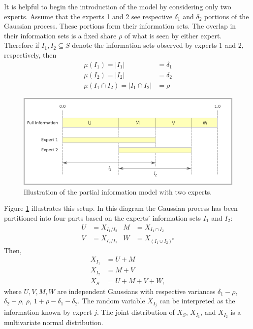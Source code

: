 \documentclass[11pt,twoside]{article}
\theoremstyle{definition}
\theoremstyle{definition}
\begin{document}
It is helpful to begin the introduction of the model by considering only two experts. Assume that the experts 1 and 2 see respective $\delta_1$ and $\delta_2$ portions of the Gaussian process. These portions form their information sets. The overlap in their information sets is a fixed share $\rho$ of what is seen by either expert. Therefore if $I_1, I_2 \subseteq S$ denote the information sets observed by experts 1 and 2, respectively, then
\begin{align*}
\mu(I_1) = |I_1| &= \delta_1\\
\mu(I_2) = |I_2| &= \delta_2\\
\mu(I_1 \cap I_2) =  |I_1 \cap I_2| &= \rho
\end{align*}
\begin{figure}[htbp]
   \includegraphics[width = \textwidth]{N=2} %
   \caption{Illustration of the partial information model with two experts.}
   \label{diagram2}
\end{figure}
Figure \ref{diagram2} illustrates this setup. In this diagram the Gaussian process has been partitioned into four parts based on the experts' information sets $I_1$ and $I_2$:
\begin{align*}
 U &= X_{I_1 / I_2}
& M &= X_{I_1 \cap I_2}\\
 V &= X_{I_2 / I_1}
& W &= X_{(I_1 \cup I_2)^c}
\end{align*}
Then,
\begin{align*}
X_{I_1} &= U + M\\
X_{I_2} &= M + V\\
X_S &= U+M+V+W,
\end{align*}
where $U, V, M, W$ are independent Gaussians with respective variances $\delta_1-\rho$, $\delta_2-\rho$, $\rho$, $1+\rho-\delta_1 - \delta_2$. The random variable $X_{I_j}$ can be interpreted as the information known by expert $j$. The joint distribution of $X_{S}$, $X_{I_1}$, and $X_{I_2}$ is a multivariate normal distribution. 
\end{document}
